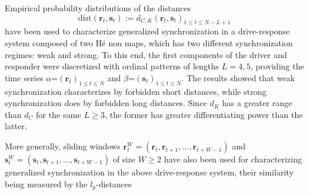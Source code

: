 \documentclass[%
 aip,
 amsmath,amssymb,
 reprint,%
]{revtex4-1}
\newtheorem{remark}[theorem]{Remark}
\begin{document}

Empirical probability distributions of the distances
\begin{equation}
\mathrm{dist}(\mathbf{r%
}_{t},\mathbf{s}_{t}):=d_{C,K}(\mathbf{r}_{t},\mathbf{s}_{t})_{1\leq t\leq
N-L+1}
\label{W=1}
\end{equation} 
have been used \cite{Amigo2025} to characterize generalized
synchronization in a drive-response system composed of two H\'{e}%
non maps, which has two different synchronization regimes: weak and strong.
To this end, the first components of the driver and responder were
discretized with ordinal patterns of lengths $L=4,5$, providing the time
series $\alpha$=$(\mathbf{r}_{t})_{1\leq t\leq N}$ and $\beta$=$(\mathbf{s}_{t})_{1\leq t\leq
N}$. The results showed that weak synchronization characterizes by
forbidden short distances, while strong synchronization does by forbidden long distances. Since $d_{K}$ has a greater range than $d_{C}$ for the same $L\ge 3$, the former has greater differentiating power
than the latter.

More generally, sliding windows $\mathbf{r}_{t}^{W}=(\mathbf{r}_{t},\mathbf{r%
}_{t+1},...,\mathbf{r}_{t+W-1})$ and $\mathbf{s}_{t}^{W}=(\mathbf{s}_{t},%
\mathbf{s}_{t+1},...,\mathbf{s}_{t+W-1})$ of size $W\geq 2$ have also been
used \cite{Amigo2025} for characterizing generalized synchronization in the above 
drive-response system, their similarity being measured by the $l_{p}$-distances
\end{document}

